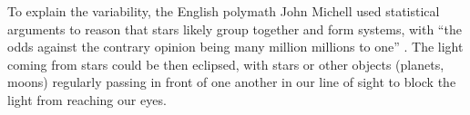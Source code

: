 To explain the variability, the English polymath John Michell used statistical arguments to reason that stars likely group together and form systems, with ``the odds against the contrary opinion being many million millions to one'' \citep{michell1767inquiry}. 
The light coming from stars could be then eclipsed, with stars or other objects (planets, moons) regularly passing in front of one another in our line of sight to block the light from reaching our eyes. 

